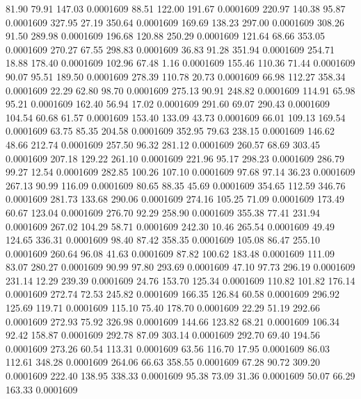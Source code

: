   81.90   79.91  147.03   0.0001609
  88.51  122.00  191.67   0.0001609
 220.97  140.38   95.87   0.0001609
 327.95   27.19  350.64   0.0001609
 169.69  138.23  297.00   0.0001609
 308.26   91.50  289.98   0.0001609
 196.68  120.88  250.29   0.0001609
 121.64   68.66  353.05   0.0001609
 270.27   67.55  298.83   0.0001609
  36.83   91.28  351.94   0.0001609
 254.71   18.88  178.40   0.0001609
 102.96   67.48    1.16   0.0001609
 155.46  110.36   71.44   0.0001609
  90.07   95.51  189.50   0.0001609
 278.39  110.78   20.73   0.0001609
  66.98  112.27  358.34   0.0001609
  22.29   62.80   98.70   0.0001609
 275.13   90.91  248.82   0.0001609
 114.91   65.98   95.21   0.0001609
 162.40   56.94   17.02   0.0001609
 291.60   69.07  290.43   0.0001609
 104.54   60.68   61.57   0.0001609
 153.40  133.09   43.73   0.0001609
  66.01  109.13  169.54   0.0001609
  63.75   85.35  204.58   0.0001609
 352.95   79.63  238.15   0.0001609
 146.62   48.66  212.74   0.0001609
 257.50   96.32  281.12   0.0001609
 260.57   68.69  303.45   0.0001609
 207.18  129.22  261.10   0.0001609
 221.96   95.17  298.23   0.0001609
 286.79   99.27   12.54   0.0001609
 282.85  100.26  107.10   0.0001609
  97.68   97.14   36.23   0.0001609
 267.13   90.99  116.09   0.0001609
  80.65   88.35   45.69   0.0001609
 354.65  112.59  346.76   0.0001609
 281.73  133.68  290.06   0.0001609
 274.16  105.25   71.09   0.0001609
 173.49   60.67  123.04   0.0001609
 276.70   92.29  258.90   0.0001609
 355.38   77.41  231.94   0.0001609
 267.02  104.29   58.71   0.0001609
 242.30   10.46  265.54   0.0001609
  49.49  124.65  336.31   0.0001609
  98.40   87.42  358.35   0.0001609
 105.08   86.47  255.10   0.0001609
 260.64   96.08   41.63   0.0001609
  87.82  100.62  183.48   0.0001609
 111.09   83.07  280.27   0.0001609
  90.99   97.80  293.69   0.0001609
  47.10   97.73  296.19   0.0001609
 231.14   12.29  239.39   0.0001609
  24.76  153.70  125.34   0.0001609
 110.82  101.82  176.14   0.0001609
 272.74   72.53  245.82   0.0001609
 166.35  126.84   60.58   0.0001609
 296.92  125.69  119.71   0.0001609
 115.10   75.40  178.70   0.0001609
  22.29   51.19  292.66   0.0001609
 272.93   75.92  326.98   0.0001609
 144.66  123.82   68.21   0.0001609
 106.34   92.42  158.87   0.0001609
 292.78   87.09  303.14   0.0001609
 292.70   69.40  194.56   0.0001609
 273.26   60.54  113.31   0.0001609
  63.56  116.70   17.95   0.0001609
  86.03  112.61  348.28   0.0001609
 264.06   66.63  358.55   0.0001609
  67.28   90.72  309.20   0.0001609
 222.40  138.95  338.33   0.0001609
  95.38   73.09   31.36   0.0001609
  50.07   66.29  163.33   0.0001609
